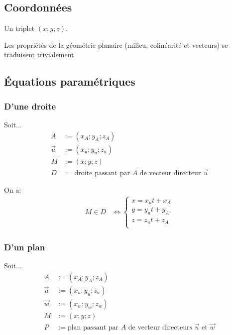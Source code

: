 \documentclass{article}
\begin{document}
\subsection{Coordonnées}

Un triplet $(x; y; z)$.

Les propriétés de la géométrie planaire (milieu, colinéarité et vecteurs) se traduisent trivialement

\subsection{Équations paramétriques}

\subsubsection{D'une droite}

Soit...
\begin{equation*}
    \begin{split}
        A &:= (x_A; y_A; z_A) \\
        \vec u &:= (x_u; y_u; z_u) \\
        M &:= (x; y; z) \\
        D &:= \text{droite passant par $A$ de vecteur directeur $\vec u$}
    \end{split}
\end{equation*}

On a:
\begin{equation*}
    \begin{split}
        M \in D &\iff
        \begin{cases}
            x = x_ut + x_A \\
            y = y_ut + y_A \\
            z = z_ut + z_A \\
        \end{cases}
    \end{split}
\end{equation*}

\subsubsection{D'un plan}

Soit...
\begin{equation*}
    \begin{split}
        A &:= (x_A; y_A; z_A) \\
        \vec u &:= (x_u; y_u; z_u) \\
        \vec w &:= (x_w; y_w; z_w) \\
        M &:= (x; y; z) \\
        P &:= \text{plan passant par $A$ de vecteur directeurs $\vec u$ et $\vec w$}
    \end{split}
\end{equation*}
\end{document}
